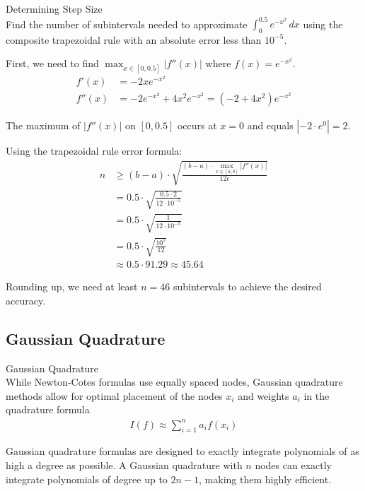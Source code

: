 \begin{example2}{Determining Step Size}\\
Find the number of subintervals needed to approximate $\int_0^{0.5} e^{-x^2} \, dx$ using the composite trapezoidal rule with an absolute error less than $10^{-5}$.

First, we need to find $\max_{x\in[0,0.5]}|f''(x)|$ where $f(x) = e^{-x^2}$.
\begin{align*}
f'(x) &= -2xe^{-x^2}\\
f''(x) &= -2e^{-x^2} + 4x^2e^{-x^2} = (-2 + 4x^2)e^{-x^2}
\end{align*}

The maximum of $|f''(x)|$ on $[0,0.5]$ occurs at $x = 0$ and equals $|-2 \cdot e^0| = 2$.

Using the trapezoidal rule error formula:
\begin{align*}
n &\geq (b-a) \cdot \sqrt{\frac{(b-a) \cdot \max_{x\in[a,b]}|f''(x)|}{12\epsilon}}\\
&= 0.5 \cdot \sqrt{\frac{0.5 \cdot 2}{12 \cdot 10^{-5}}}\\
&= 0.5 \cdot \sqrt{\frac{1}{12 \cdot 10^{-5}}}\\
&= 0.5 \cdot \sqrt{\frac{10^5}{12}}\\
&\approx 0.5 \cdot 91.29 \approx 45.64
\end{align*}

Rounding up, we need at least $n = 46$ subintervals to achieve the desired accuracy.
\end{example2}

\subsection{Gaussian Quadrature}

\begin{concept}{Gaussian Quadrature}\\
While Newton-Cotes formulas use equally spaced nodes, Gaussian quadrature methods allow for optimal placement of the nodes $x_i$ and weights $a_i$ in the quadrature formula
\begin{align*}
I(f) \approx \sum_{i=1}^{n} a_i f(x_i)
\end{align*}

Gaussian quadrature formulas are designed to exactly integrate polynomials of as high a degree as possible. A Gaussian quadrature with $n$ nodes can exactly integrate polynomials of degree up to $2n-1$, making them highly efficient.
\end{concept}

